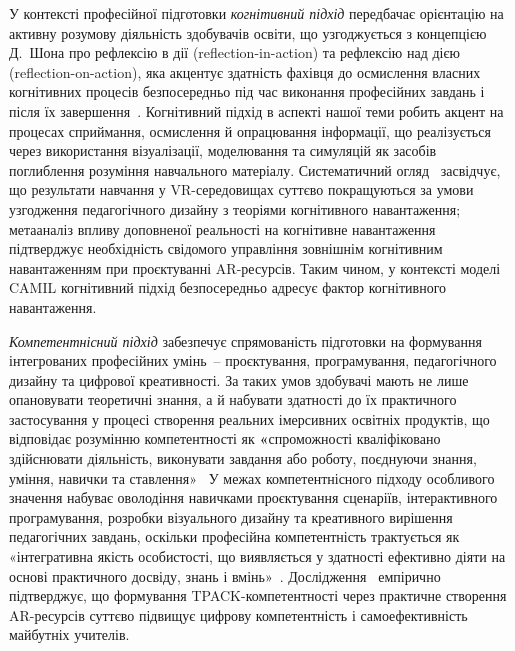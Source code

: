 У контексті професійної підготовки \emph{когнітивний підхід} передбачає орієнтацію на активну розумову діяльність здобувачів освіти, що узгоджується з концепцією Д.~Шона про рефлексію в дії (reflection-in-action) та рефлексію над дією (reflection-on-action), яка акцентує здатність фахівця до осмислення власних когнітивних процесів безпосередньо під час виконання професійних завдань і після їх завершення~\cite{ReflexiveApproach2018}. Когнітивний підхід в аспекті нашої теми робить акцент на процесах сприймання, осмислення й опрацювання інформації, що реалізується через використання візуалізації, моделювання та симуляцій як засобів поглиблення розуміння навчального матеріалу. Систематичний огляд~\cite{Mallek2024SynthesizingVR} засвідчує, що результати навчання у VR-середовищах суттєво покращуються за умови узгодження педагогічного дизайну з теоріями когнітивного навантаження; метааналіз впливу доповненої реальності на когнітивне навантаження~\cite{Buchner2021CogLoad} підтверджує необхідність свідомого управління зовнішнім когнітивним навантаженням при проєктуванні AR-ресурсів. Таким чином, у контексті моделі CAMIL когнітивний підхід безпосередньо адресує фактор когнітивного навантаження.

\emph{Компетентнісний підхід} забезпечує спрямованість підготовки на формування інтегрованих професійних умінь~-- проєктування, програмування, педагогічного дизайну та цифрової креативності. За таких умов здобувачі мають не лише опановувати теоретичні знання, а й набувати здатності до їх практичного застосування у процесі створення реальних імерсивних освітніх продуктів, що відповідає розумінню компетентності як \textbf{«}спроможності кваліфіковано здійснювати діяльність, виконувати завдання або роботу, поєднуючи знання, уміння, навички та ставлення»~\cite[c.~240]{Dychkivska2012Innovative} У межах компетентнісного підходу особливого значення набуває оволодіння навичками проєктування сценаріїв, інтерактивного програмування, розробки візуального дизайну та креативного вирішення педагогічних завдань, оскільки професійна компетентність трактується як «інтегративна якість особистості, що виявляється у здатності ефективно діяти на основі практичного досвіду, знань і вмінь»~\cite[c.~96]{Dychkivska2012Innovative}. Дослідження~\cite{BeldaMedina2022TPACK} емпірично підтверджує, що формування TPACK-компетентності через практичне створення AR-ресурсів суттєво підвищує цифрову компетентність і самоефективність майбутніх учителів.

